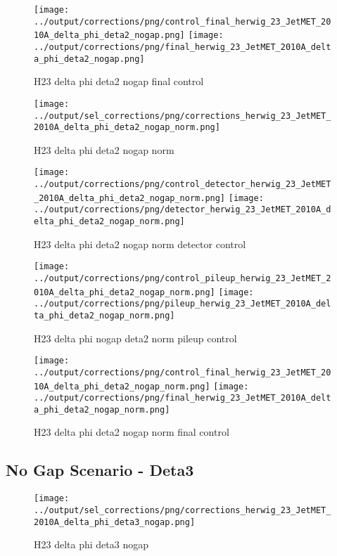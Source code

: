 \documentclass[11pt]{book}
\begin{document}
\begin{figure}[ht]
\centering
\texttt{[image: ../output/corrections/png/control\_final\_herwig\_23\_JetMET\_2010A\_delta\_phi\_deta2\_nogap.png]}
\texttt{[image: ../output/corrections/png/final\_herwig\_23\_JetMET\_2010A\_delta\_phi\_deta2\_nogap.png]}
\caption{H23 delta phi deta2 nogap final control}
\label{fig:H23_JetMET_2010A_delta_phi_deta2_nogap_final_control}
\end{figure}

\begin{figure}[ht]
\centering
\texttt{[image: ../output/sel\_corrections/png/corrections\_herwig\_23\_JetMET\_2010A\_delta\_phi\_deta2\_nogap\_norm.png]}
\caption{H23 delta phi deta2 nogap norm}
\label{fig:H23_JetMET_2010A_delta_phi_deta2_nogap_norm}
\end{figure}

\begin{figure}[ht]
\centering
\texttt{[image: ../output/corrections/png/control\_detector\_herwig\_23\_JetMET\_2010A\_delta\_phi\_deta2\_nogap\_norm.png]}
\texttt{[image: ../output/corrections/png/detector\_herwig\_23\_JetMET\_2010A\_delta\_phi\_deta2\_nogap\_norm.png]}
\caption{H23 delta phi deta2 nogap norm detector control}
\label{fig:H23_JetMET_2010A_delta_phi_deta2_nogap_norm_detector_control}
\end{figure}

\begin{figure}[ht]
\centering
\texttt{[image: ../output/corrections/png/control\_pileup\_herwig\_23\_JetMET\_2010A\_delta\_phi\_deta2\_nogap\_norm.png]}
\texttt{[image: ../output/corrections/png/pileup\_herwig\_23\_JetMET\_2010A\_delta\_phi\_deta2\_nogap\_norm.png]}
\caption{H23 delta phi nogap deta2 norm pileup control}
\label{fig:H23_JetMET_2010A_delta_phi_deta2_nogap_norm_pileup_control}
\end{figure}


\begin{figure}[ht]
\centering
\texttt{[image: ../output/corrections/png/control\_final\_herwig\_23\_JetMET\_2010A\_delta\_phi\_deta2\_nogap\_norm.png]}
\texttt{[image: ../output/corrections/png/final\_herwig\_23\_JetMET\_2010A\_delta\_phi\_deta2\_nogap\_norm.png]}
\caption{H23 delta phi deta2 nogap norm final control}
\label{fig:H23_JetMET_2010A_delta_phi_deta2_nogap_norm_final_control}
\end{figure}


\clearpage
\subsection{No Gap Scenario - Deta3}
\begin{figure}[ht]
\centering
\texttt{[image: ../output/sel\_corrections/png/corrections\_herwig\_23\_JetMET\_2010A\_delta\_phi\_deta3\_nogap.png]}
\caption{H23 delta phi deta3 nogap}
\label{fig:H23_JetMET_2010A_delta_phi_deta3_nogap}
\end{figure}
\end{document}
